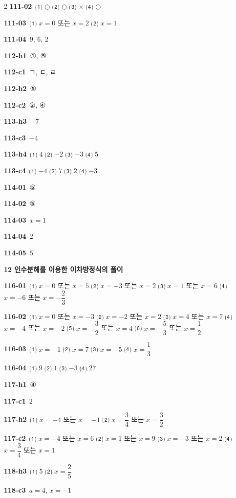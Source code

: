 \documentclass[10pt,a4paper]{article}
\begin{document}
\begin{multicols}{2}
\noindent\textbf{111-02}\ ⑴ $\bigcirc$ ⑵ $\bigcirc$ ⑶ $\times$ ⑷ $\bigcirc$\par
\noindent\textbf{111-03}\ ⑴ $x=0$ 또는 $x=2$ ⑵ $x=1$\par
\noindent\textbf{111-04}\ $9$, $6$, $2$\par
\noindent\textbf{112-h1}\ ①, ⑤\par
\noindent\textbf{112-c1}\ ㄱ, ㄷ, ㄹ\par
\noindent\textbf{112-h2}\ ⑤\par
\noindent\textbf{112-c2}\ ②, ④\par
\noindent\textbf{113-h3}\ $-7$\par
\noindent\textbf{113-c3}\ $-4$\par
\noindent\textbf{113-h4}\ ⑴ $4$ ⑵ $-2$ ⑶ $-3$ ⑷ $5$\par
\noindent\textbf{113-c4}\ ⑴ $-4$ ⑵ $7$ ⑶ $2$ ⑷ $-3$\par
\noindent\textbf{114-01}\ ⑤\par
\noindent\textbf{114-02}\ ⑤\par
\noindent\textbf{114-03}\ $x=1$\par
\noindent\textbf{114-04}\ $2$\par
\noindent\textbf{114-05}\ $5$\par
\noindent\textbf{12 인수분해를 이용한 이차방정식의 풀이}\par\smallskip
\noindent\textbf{116-01}\ ⑴ $x=0$ 또는 $x=5$ ⑵ $x=-3$ 또는 $x=2$ ⑶ $x=1$ 또는 $x=6$ ⑷ $x=-6$ 또는 $x=-\dfrac{2}{3}$\par
\noindent\textbf{116-02}\ ⑴ $x=0$ 또는 $x=-3$ ⑵ $x=-2$ 또는 $x=2$ ⑶ $x=4$ 또는 $x=7$ ⑷ $x=-4$ 또는 $x=-2$ ⑸ $x=-\dfrac{3}{2}$ 또는 $x=4$ ⑹ $x=-\dfrac{5}{3}$ 또는 $x=\dfrac{1}{2}$\par
\noindent\textbf{116-03}\ ⑴ $x=-1$ ⑵ $x=7$ ⑶ $x=-5$ ⑷ $x=\dfrac{1}{3}$\par
\noindent\textbf{116-04}\ ⑴ $9$ ⑵ $1$ ⑶ $-3$ ⑷ $27$\par
\noindent\textbf{117-h1}\ ④\par
\noindent\textbf{117-c1}\ $2$\par
\noindent\textbf{117-h2}\ ⑴ $x=-4$ 또는 $x=-1$ ⑵ $x=\dfrac{3}{4}$ 또는 $x=\dfrac{3}{2}$\par
\noindent\textbf{117-c2}\ ⑴ $x=-4$ 또는 $x=6$ ⑵ $x=1$ 또는 $x=9$ ⑶ $x=-3$ 또는 $x=2$ ⑷ $x=\dfrac{3}{4}$ 또는 $x=1$\par
\noindent\textbf{118-h3}\ ⑴ $5$ ⑵ $x=\dfrac{2}{5}$\par
\noindent\textbf{118-c3}\ $a=4$, $x=-1$\par

\end{multicols}
\end{document}
